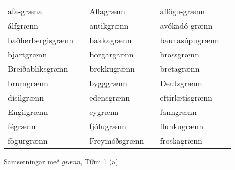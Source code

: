 \documentclass[../samsetningasafn.tex]{subfiles}
\begin{document}
\begin{wordlist}[H]
\begin{tcolorbox}

	\setlength{\extrarowheight}{3pt}
	\begin{tabular}{BlBlBl}	
		afa-græna	&		& 
		Aflagrænn	&		& 
		aflögu-grænn & 		\\  %
		álfgrænn	&		& 
		antikgrænn	&		& 
		avókadó-grænn & 	\\  %
		baðherbergisgrænn & & 
		bakkagrænn	&		& 
		baunasúpugrænn & 	\\  %
		bjartgrænn	&		& 
		borgargrænn	&		& 
		brassgrænn	&		\\  %
		Breiðabliksgrænn & 	& 
		brekkugrænn	&		& 
		bretagrænn	&		\\  %
		brumgrænn	&		& 
		bygggrænn	&		& 
		Deutzgrænn	&		\\  %
		dísilgrænn	&		& 
		edensgrænn	&		& 
		eftirlætisgrænn & 	\\  %
		Engilgrænn	&		& 
		eygrænn		&		& 
		fanngrænn	&		\\  %
		fégrænn		&		& 
		fjólugrænn	&		& 
		flunkugrænn	&		\\  %
		fögurgrænn	&		& 
		Freymóðsgrænn & 	& 
		froskagrænn &		  %
	\end{tabular}

\end{tcolorbox}
	\caption{Samsetningar með \textit{grænn}, Tíðni 1 (a)}
	\label{listi:graent.1b}
\end{wordlist}		
		
\end{document}
